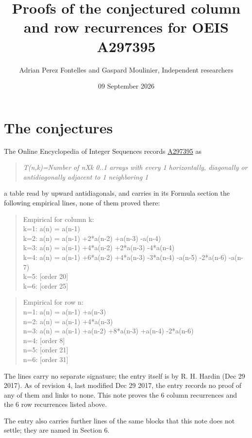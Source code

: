 \documentclass[11pt]{article}
\title{Proofs of the conjectured column and row recurrences for OEIS A297395}
\author{Adrian Perez Fontelles and Gaspard Moulinier, Independent researchers}
\date{09 September 2026}
\theoremstyle{definition}
\begin{document}
\maketitle
\section{The conjectures}

The Online Encyclopedia of Integer Sequences records \href{https://oeis.org/A297395}{A297395} as

\begin{quote}\itshape T(n,k)=Number of nXk 0..1 arrays with every 1 horizontally, diagonally or antidiagonally adjacent to 1 neighboring 1\end{quote}

a table read by upward antidiagonals, and carries in its Formula section the following empirical lines, none of them proved there:

\begin{quote}\ttfamily Empirical for column k:\\
k=1: a(n) = a(n-1)\\k=2: a(n) = a(n-1) +2*a(n-2) +a(n-3) -a(n-4)\\k=3: a(n) = a(n-1) +4*a(n-2) +2*a(n-3) -4*a(n-4)\\k=4: a(n) = a(n-1) +6*a(n-2) +4*a(n-3) -3*a(n-4) -a(n-5) -2*a(n-6) -a(n-7)\\k=5: [order 20]\\k=6: [order 25]\end{quote}

\begin{quote}\ttfamily Empirical for row n:\\
n=1: a(n) = a(n-1) +a(n-3)\\n=2: a(n) = a(n-1) +4*a(n-3)\\n=3: a(n) = a(n-1) +a(n-2) +8*a(n-3) +a(n-4) -2*a(n-6)\\n=4: [order 8]\\n=5: [order 21]\\n=6: [order 31]\end{quote}

The lines carry no separate signature; the entry itself is by R. H. Hardin (Dec 29 2017). As of revision 4, last modified Dec 29 2017, the entry records no proof of any of them and links to none. This note proves the 6 column recurrences and the 6 row recurrences listed above.

The entry also carries further lines of the same blocks that this note does not settle; they are named in Section 6.
\end{document}
